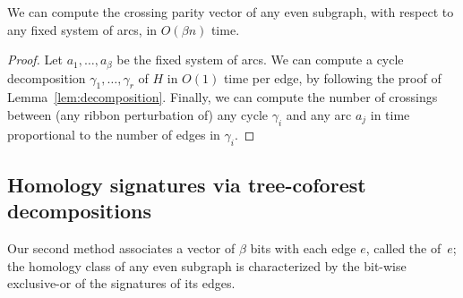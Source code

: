 \documentclass[letterpaper,review]{siamart190516}
\def\Z{\mathbb{Z}}
\def\modified#1{\color{blue}#1 \color{black}}
\def\anote#1{\color{purple}Amir: #1 \color{black}}
\def\jnote#1{\textcolor{orange}{Jeff: #1}}
\def\enote#1{\textcolor{magenta}{Erin: #1}}
\begin{document}

\begin{lemma}
We can compute the crossing parity vector of any even subgraph, with respect to any fixed system of arcs, in $O(\beta n)$ time.
\end{lemma}

\begin{proof}
Let $a_1,\dots, a_\beta$ be the fixed system of arcs. 
We can compute a cycle decomposition $\gamma_1, \dots, \gamma_r$ of $H$ in $O(1)$ time per edge, by following the proof of Lemma~\ref{lem:decomposition}.  Finally, we can compute the number of crossings between (any ribbon perturbation of) any cycle $\gamma_i$ and any arc $a_j$ in time proportional to the number of edges in $\gamma_i$.
\end{proof}
%
%



\subsection{Homology signatures via tree-coforest decompositions}
\label{sec:characterizing_signatures}

Our second method associates a vector of $\beta$ bits with each edge $e$, called the  of~$e$; the homology class of any even subgraph is characterized by the bit-wise exclusive-or of the signatures of its edges.
\end{document}
